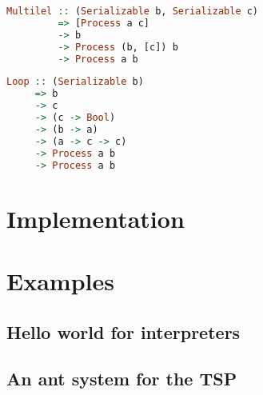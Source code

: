 \begin{lstlisting}[language=Haskell]
Multilel :: (Serializable b, Serializable c)
         => [Process a c]
         -> b
         -> Process (b, [c]) b
         -> Process a b
\end{lstlisting}

\begin{lstlisting}[language=Haskell]
Loop :: (Serializable b)
     => b
     -> c
     -> (c -> Bool)
     -> (b -> a)
     -> (a -> c -> c)
     -> Process a b
     -> Process a b
\end{lstlisting}

\section{Implementation}
\label{chp:implementation}

\section{Examples}

\subsection{Hello world for interpreters}

\subsection{An ant system for the TSP}
